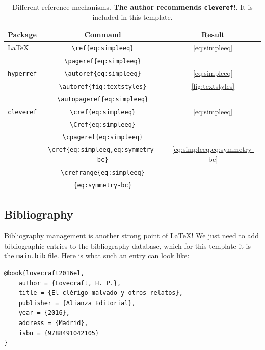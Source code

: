\begin{table}[h]
	\centering
	\begin{tabular}{lcc}
	  \toprule
	  Package & Command & Result \\
	  \midrule
	  \LaTeX & \verb|\ref{eq:simpleeq}| & \ref{eq:simpleeq} \\
	  & \verb|\pageref{eq:simpleeq}| & \pageref{eq:simpleeq} \\
	  \cmidrule{2-3}
	  \texttt{hyperref} & \verb|\autoref{eq:simpleeq}| & \autoref{eq:simpleeq} \\
			  & \verb|\autoref{fig:textstyles}| & \autoref{fig:textstyles} \\
			  & \verb|\autopageref{eq:simpleeq}| & \autopageref{eq:simpleeq} \\
	  \cmidrule{2-3}
	  \texttt{cleveref} & \verb|\cref{eq:simpleeq}| & \cref{eq:simpleeq} \\
			  & \verb|\Cref{eq:simpleeq}| & \Cref{eq:simpleeq} \\
	  & \verb|\cpageref{eq:simpleeq}| & \cpageref{eq:simpleeq} \\
			  & \verb|\cref{eq:simpleeq,eq:symmetry-bc}| & \cref{eq:simpleeq,eq:symmetry-bc} \\
			  & \verb|\crefrange{eq:simpleeq}| & \multirow{2}{*}{\crefrange{eq:simpleeq}{eq:symmetry-bc}}\\
	  & \verb|{eq:symmetry-bc}| & \\
	  \bottomrule
	\end{tabular}
	\caption[Different reference mechanisms.]{Different reference mechanisms. \textbf{The author recommends \texttt{cleveref}!}. It is included in this template.}
	\label{tab:reference-systems}
\end{table}

\subsection{Bibliography}

Bibliography management is another strong point of \LaTeX! We just need to add bibliographic entries to the bibliography database, which for this template it is the \texttt{main.bib} file. Here is what such an entry can look like:

\begin{lstlisting}[language={[LaTeX]TeX}]
@book{lovecraft2016el,
	author = {Lovecraft, H. P.},
	title = {El clérigo malvado y otros relatos},
	publisher = {Alianza Editorial},
	year = {2016},
	address = {Madrid},
	isbn = {9788491042105}
}
\end{lstlisting}

